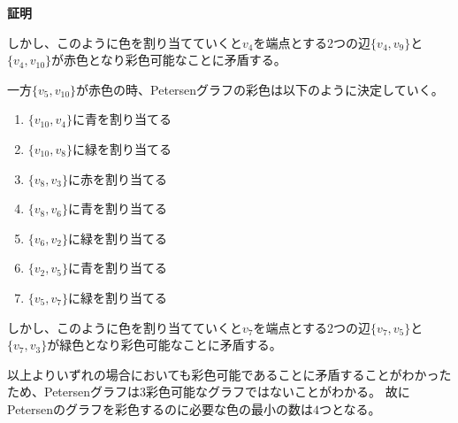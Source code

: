 \documentclass[uplatex,dvipdfmx,a4paper,10pt]{jsarticle}
\makeatletter
\theoremstyle{definition}
\renewenvironment{proof}[1][\proofname]{\par
  \pushQED{\qed}%
  \normalfont \topsep6\p@\@plus6\p@\relax
  \trivlist
  \item\relax
  {\bfseries
  #1\@addpunct{.}}\hspace\labelsep\ignorespaces
}{%
  \popQED\endtrivlist\@endpefalse
}
\makeatother
\begin{document}
\begin{proof}[証明]
しかし、このように色を割り当てていくと\(v_4\)を端点とする2つの辺\(\{v_4, v_9\}\)と\(\{v_4, v_{10}\}\)が赤色となり彩色可能なことに矛盾する。

一方\(\{v_5, v_{10}\}\)が赤色の時、Petersenグラフの彩色は以下のように決定していく。

\begin{enumerate}
  \item \(\{v_{10}, v_4\}\)に青を割り当てる
  \item \(\{v_{10}, v_8\}\)に緑を割り当てる
  \item \(\{v_8, v_3\}\)に赤を割り当てる
  \item \(\{v_8, v_6\}\)に青を割り当てる
  \item \(\{v_6, v_2\}\)に緑を割り当てる
  \item \(\{v_2, v_5\}\)に青を割り当てる
  \item \(\{v_5, v_7\}\)に緑を割り当てる
\end{enumerate}

しかし、このように色を割り当てていくと\(v_7\)を端点とする2つの辺\(\{v_7, v_5\}\)と\(\{v_7, v_3\}\)が緑色となり彩色可能なことに矛盾する。

以上よりいずれの場合においても彩色可能であることに矛盾することがわかったため、Petersenグラフは3彩色可能なグラフではないことがわかる。
故にPetersenのグラフを彩色するのに必要な色の最小の数は\(4\)つとなる。
\end{proof}


\appendix
\setcounter{figure}{0}
\setcounter{table}{0}
\renewcommand{\thetable}{\Alph{section}\arabic{table}}
\renewcommand{\thefigure}{\Alph{section}\arabic{figure}}
\makeatletter 
\newcommand{\section@cntformat}{付録 \thesection:\ }
\makeatother

    
\end{document}
